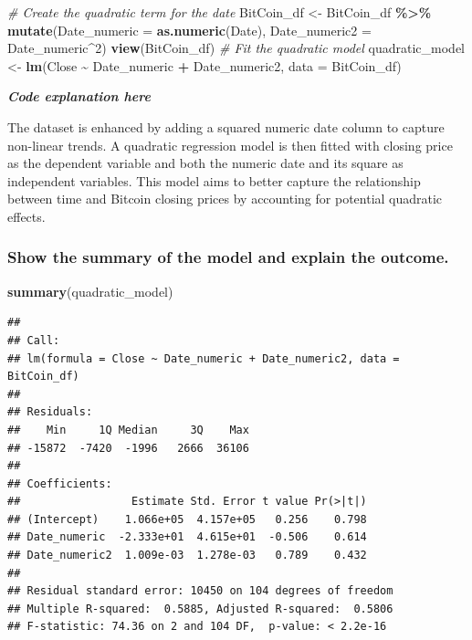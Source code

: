 \documentclass[
]{book}
\newenvironment{Shaded}{\begin{snugshade}}{\end{snugshade}}
\newcommand{\AttributeTok}[1]{\textcolor[rgb]{0.13,0.29,0.53}{#1}}
\newcommand{\CommentTok}[1]{\textcolor[rgb]{0.56,0.35,0.01}{\textit{#1}}}
\newcommand{\DecValTok}[1]{\textcolor[rgb]{0.00,0.00,0.81}{#1}}
\newcommand{\FunctionTok}[1]{\textcolor[rgb]{0.13,0.29,0.53}{\textbf{#1}}}
\newcommand{\NormalTok}[1]{#1}
\newcommand{\OtherTok}[1]{\textcolor[rgb]{0.56,0.35,0.01}{#1}}
\newcommand{\SpecialCharTok}[1]{\textcolor[rgb]{0.81,0.36,0.00}{\textbf{#1}}}
\begin{document}
\begin{Shaded}
\begin{Highlighting}[]
\CommentTok{\# Create the quadratic term for the date}
\NormalTok{BitCoin\_df }\OtherTok{\textless{}{-}}\NormalTok{ BitCoin\_df }\SpecialCharTok{\%\textgreater{}\%}
  \FunctionTok{mutate}\NormalTok{(}\AttributeTok{Date\_numeric =} \FunctionTok{as.numeric}\NormalTok{(Date),}
         \AttributeTok{Date\_numeric2 =}\NormalTok{ Date\_numeric}\SpecialCharTok{\^{}}\DecValTok{2}\NormalTok{)}
\FunctionTok{view}\NormalTok{(BitCoin\_df)}
\CommentTok{\# Fit the quadratic model}
\NormalTok{quadratic\_model }\OtherTok{\textless{}{-}} \FunctionTok{lm}\NormalTok{(Close }\SpecialCharTok{\textasciitilde{}}\NormalTok{ Date\_numeric }\SpecialCharTok{+}\NormalTok{ Date\_numeric2, }\AttributeTok{data =}\NormalTok{ BitCoin\_df)}
\end{Highlighting}
\end{Shaded}

\emph{\textbf{Code explanation here}}

The dataset is enhanced by adding a squared numeric date column to capture non-linear trends. A quadratic regression model is then fitted with closing price as the dependent variable and both the numeric date and its square as independent variables. This model aims to better capture the relationship between time and Bitcoin closing prices by accounting for potential quadratic effects.

\subsubsection{Show the summary of the model and explain the outcome.}\label{show-the-summary-of-the-model-and-explain-the-outcome.-1}

\begin{Shaded}
\begin{Highlighting}[]
\FunctionTok{summary}\NormalTok{(quadratic\_model)}
\end{Highlighting}
\end{Shaded}

\begin{verbatim}
## 
## Call:
## lm(formula = Close ~ Date_numeric + Date_numeric2, data = BitCoin_df)
## 
## Residuals:
##    Min     1Q Median     3Q    Max 
## -15872  -7420  -1996   2666  36106 
## 
## Coefficients:
##                 Estimate Std. Error t value Pr(>|t|)
## (Intercept)    1.066e+05  4.157e+05   0.256    0.798
## Date_numeric  -2.333e+01  4.615e+01  -0.506    0.614
## Date_numeric2  1.009e-03  1.278e-03   0.789    0.432
## 
## Residual standard error: 10450 on 104 degrees of freedom
## Multiple R-squared:  0.5885, Adjusted R-squared:  0.5806 
## F-statistic: 74.36 on 2 and 104 DF,  p-value: < 2.2e-16
\end{verbatim}
\end{document}
